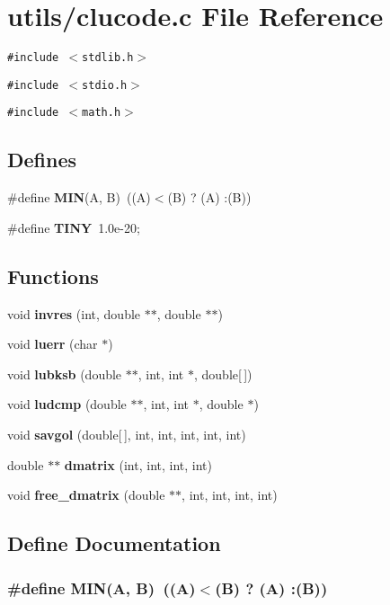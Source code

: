 \section{utils/clucode.c File Reference}
\label{clucode_8c}
{\tt \#include $<$stdlib.h$>$}\par
{\tt \#include $<$stdio.h$>$}\par
{\tt \#include $<$math.h$>$}\par
\subsection*{Defines}
\begin{CompactItemize}
\item 
\#define {\bf MIN}(A, B)~((A)$<$(B) ? (A) :(B))
\item 
\#define {\bf TINY}~1.0e-20;
\end{CompactItemize}
\subsection*{Functions}
\begin{CompactItemize}
\item 
void {\bf invres} (int, double $\ast$$\ast$, double $\ast$$\ast$)
\item 
void {\bf luerr} (char $\ast$)
\item 
void {\bf lubksb} (double $\ast$$\ast$, int, int $\ast$, double[$\,$])
\item 
void {\bf ludcmp} (double $\ast$$\ast$, int, int $\ast$, double $\ast$)
\item 
void {\bf savgol} (double[$\,$], int, int, int, int, int)
\item 
double $\ast$$\ast$ {\bf dmatrix} (int, int, int, int)
\item 
void {\bf free\_\-dmatrix} (double $\ast$$\ast$, int, int, int, int)
\end{CompactItemize}


\subsection{Define Documentation}
\subsubsection{\setlength{\rightskip}{0pt plus 5cm}\#define MIN(A, B)~((A)$<$(B) ? (A) :(B))}\label{clucode_8c_dcd021ac91d43a62b2cdecf9a5b971a7}


